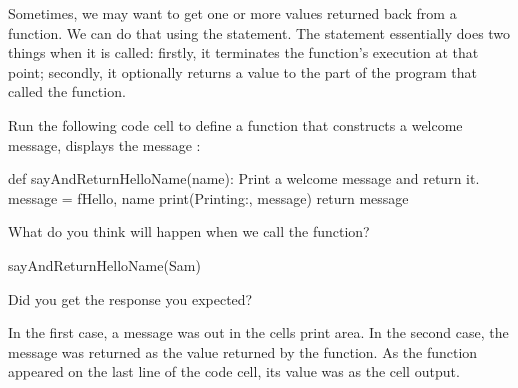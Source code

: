 \documentclass[letterpaper,10pt,english]{sphinxmanual}
\begin{document}
Sometimes, we may want to get one or more values returned back from a function. We can do that using the  statement. The  statement essentially does two things when it is called: firstly, it terminates the function’s execution at that point; secondly, it optionally returns a value to the part of the program that called the function.

Run the following code cell to define a function that constructs a welcome message, displays the message :

{
\begin{sphinxVerbatim}[commandchars=\\\{\}]
\llap{\color{nbsphinxin}[ ]:\,\hspace{\fboxrule}\hspace{\fboxsep}}def sayAndReturnHelloName(name):
    \PYGZdq{}\PYGZdq{}\PYGZdq{}Print a welcome message and return it.\PYGZdq{}\PYGZdq{}\PYGZdq{}
    message = f\PYGZdq{}Hello, \PYGZob{}name\PYGZcb{}\PYGZdq{}
    print(\PYGZdq{}Printing:\PYGZdq{}, message)
    return message
\end{sphinxVerbatim}
}

What do you think will happen when we call the function?


{
\begin{sphinxVerbatim}[commandchars=\\\{\}]
\llap{\color{nbsphinxin}[ ]:\,\hspace{\fboxrule}\hspace{\fboxsep}}sayAndReturnHelloName(\PYGZsq{}Sam\PYGZsq{})
\end{sphinxVerbatim}
}

Did you get the response you expected?

In the first case, a message was  out in the cells print area. In the second case, the message was returned as the value returned by the function. As the function appeared on the last line of the code cell, its value was  as the cell output.
\end{document}
